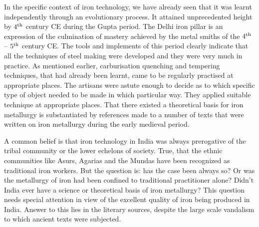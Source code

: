 In the specific context of iron technology, we have already seen that it was learnt independently through an evolutionary process. It attained unprecedented height by $4^{\rm th}$ century CE during the Gupta period. The Delhi iron pillar is an expression of the culmination of mastery achieved by the metal smiths of the $4^{\rm th}$ – $5^{\rm th}$ century CE. The tools and implements of this period clearly indicate that all the techniques of steel making were developed and they were very much in practice. As mentioned earlier, carburisation quenching and tempering techniques, that had already been learnt, came to be regularly practised at appropriate places. The artisans were astute enough to decide as to which specific type of object needed to be made in which particular way. They applied suitable technique at appropriate places. That there existed a theoretical basis for iron metallurgy is substantiated by references made to a number of texts that were written on iron metallurgy during the early medieval period.

A common belief is that iron technology in India was always prerogative of the tribal community or the lower echelons of society. True, that the ethnic communities like Asurs, Agarias and the Mundas have been recognized as traditional iron workers. But the question is: has the case been always so? Or was the metallurgy of iron had been confined to traditional practitioner alone? Didn’t India ever have a science or theoretical basis of iron metallurgy?  This question needs special attention in view of the excellent quality of iron being produced in India. Answer to this lies in the literary sources, despite the large scale vandalism to which ancient texts were subjected. 

